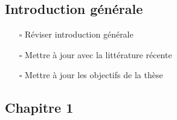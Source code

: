 \hypertarget{introduction-guxe9nuxe9rale}{%
\subsection{Introduction générale}\label{introduction-guxe9nuxe9rale}}

\begin{itemize}
\tightlist
\item[$\square$]
  Réviser introduction générale
\item[$\square$]
  Mettre à jour avec la littérature récente
\item[$\square$]
  Mettre à jour les objectifs de la thèse
\end{itemize}

\hypertarget{chapitre-1}{%
\subsection{Chapitre 1}\label{chapitre-1}}

